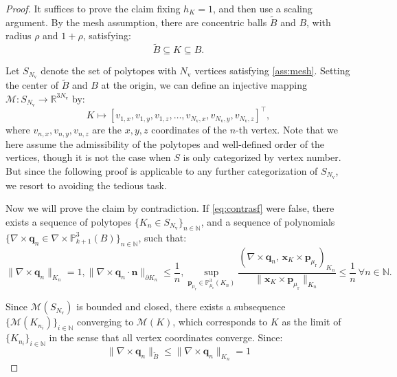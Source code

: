 \documentclass[10pt,a4paper]{amsart}
\begin{document}
\begin{proof}
  It suffices to prove the claim fixing \(h_{K}=1\), and then use a scaling argument. By the mesh assumption, there are concentric balls \(\tilde{B}\) and \(B\), with radius \(\rho\) and \(1+\rho\), satisfying:
  \begin{equation}
    \tilde{B}\subseteq K\subseteq B.
  \end{equation}

  Let \(S_{N_{\mathrm{v}}}\) denote the set of polytopes with \(N_{\mathrm{v}}\) vertices satisfying \cref{ass:mesh}. Setting the center of \(\tilde{B}\) and \(B\) at the origin, we can define an injective mapping \(\mathscr{M}:S_{N_{\mathrm{v}}}\to \mathbb{R}^{3N_{\mathrm{v}}}\) by:
  \begin{equation}
    K\mapsto\left[v_{1,x},v_{1,y},v_{1,z},\dots,v_{N_{\mathrm{v}},x},v_{N_{\mathrm{v}},y},v_{N_{\mathrm{v}},z}\right]^{\top},
  \end{equation}
  where \(v_{n,x},v_{n,y},v_{n,z}\) are the \(x,y,z\) coordinates of the \(n\)-th vertex. Note that we here assume the admissibility of the polytopes and well-defined order of the vertices, though it is not the case when \(S\) is only categorized by vertex number. But since the following proof is applicable to any further categorization of \(S_{N_{\mathrm{v}}}\), we resort to avoiding the tedious task.

  Now we will prove the claim by contradiction. If \cref{eq:contrasf} were false, there exists a sequence of polytopes \(\{K_{n}\in S_{N_{\mathrm{v}}}\}_{n\in \mathbb{N}}\), and a sequence of polynomials \(\{\nabla \times \boldsymbol{q}_{n}\in \nabla \times \mathbb{P}^{3}_{k+1}(B)\}_{n\in \mathbb{N}}\), such that:
  \begin{equation}\label{eq:pfcontrasf}
    \|\nabla \times \boldsymbol{q}_{n}\|_{K_{n}}=1,
    \|\nabla \times \boldsymbol{q}_{n}\cdot \boldsymbol{n}\|_{\partial K_{n}}\le\frac{1}{n},
    \sup_{\boldsymbol{p}_{\mu_{\mathrm{r}}}\in\mathbb{P}^{3}_{\mu_{\mathrm{r}}}\left(K_n\right)}
    \frac{(\nabla \times \boldsymbol{q}_{n},\,\boldsymbol{x}_K\times\boldsymbol{p}_{\mu_{\mathrm{r}}})_{K_{n}}}
    {\|\boldsymbol{x}_K\times\boldsymbol{p}_{\mu_{\mathrm{r}}}\|_{K_{n}}}\le\frac{1}{n}
    \ \forall n\in\mathbb{N}.
  \end{equation}

  Since \(\mathscr{M}(S_{N_{\mathrm{v}}})\) is bounded and closed, there exists a subsequence \(\{\mathscr{M}(K_{n_{i}})\}_{i\in \mathbb{N}}\) converging to \(\mathscr{M}(K)\), which corresponds to \(K\) as the limit of \(\{K_{n_{i}}\}_{i\in \mathbb{N}}\) in the sense that all vertex coordinates converge. Since:
  \begin{equation}
    \|\nabla \times \boldsymbol{q}_{n}\|_{\tilde{B}}\le\|\nabla \times \boldsymbol{q}_{n}\|_{K_{n}}=1
  \end{equation}


\end{proof}
\end{document}

